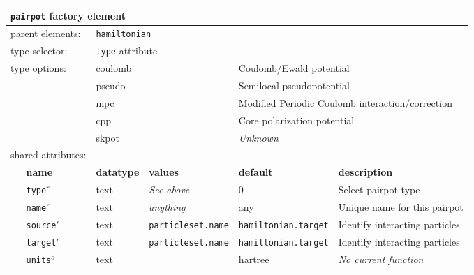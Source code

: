 \FloatBarrier
\begin{table}[h]
\begin{center}
\begin{tabularx}{\textwidth}{l l l l l l }
\hline
\multicolumn{6}{l}{\texttt{pairpot} factory element} \\
\hline
\multicolumn{2}{l}{parent elements:} & \multicolumn{4}{l}{\texttt{hamiltonian}}\\
\multicolumn{2}{l}{type   selector:} & \multicolumn{4}{l}{\texttt{type} attribute}\\
\multicolumn{2}{l}{type   options: } & \multicolumn{2}{l}{coulomb           } & \multicolumn{2}{l}{Coulomb/Ewald potential}\\
\multicolumn{2}{l}{                } & \multicolumn{2}{l}{pseudo            } & \multicolumn{2}{l}{Semilocal pseudopotential}\\
\multicolumn{2}{l}{                } & \multicolumn{2}{l}{mpc               } & \multicolumn{2}{l}{Modified Periodic Coulomb interaction/correction}\\
\multicolumn{2}{l}{                } & \multicolumn{2}{l}{cpp               } & \multicolumn{2}{l}{Core polarization potential}\\
\multicolumn{2}{l}{                } & \multicolumn{2}{l}{skpot             } & \multicolumn{2}{l}{\textit{Unknown}}\\
\multicolumn{2}{l}{shared attributes:} & \multicolumn{4}{l}{}\\
   &   \bfseries name     & \bfseries datatype & \bfseries values & \bfseries default   & \bfseries description \\
   &   \texttt{type}$^r$      &  text              & \textit{See above}        & 0                   & Select pairpot type         \\
   &   \texttt{name}$^r$      &  text              & \textit{anything}         & any                 & Unique name for this pairpot\\
   &   \texttt{source}$^r$    &  text              & \texttt{particleset.name} &\texttt{hamiltonian.target}& Identify interacting particles\\
   &   \texttt{target}$^r$    &  text              & \texttt{particleset.name} &\texttt{hamiltonian.target}& Identify interacting particles  \\
   &   \texttt{units}$^o$     &  text              &                           & hartree             & \textit{No current function}  \\
\hline
\end{tabularx}
\end{center}
\end{table}
\FloatBarrier

